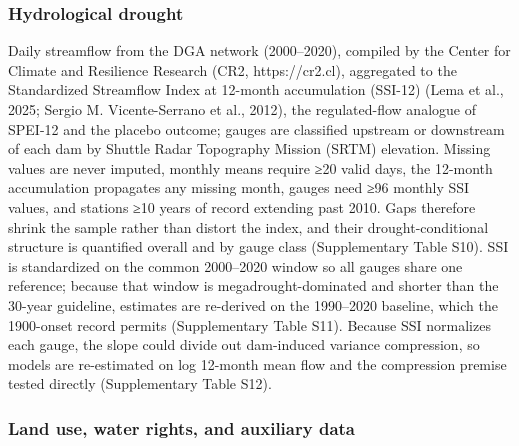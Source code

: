 \documentclass[
]{agujournal2019}
\begin{document}
\subsubsection{Hydrological drought}\label{hydrological-drought}

Daily streamflow from the DGA network (2000--2020), compiled by the
Center for Climate and Resilience Research (CR2, https://cr2.cl),
aggregated to the Standardized Streamflow Index at 12-month accumulation
(SSI-12) (Lema et al., 2025; Sergio M. Vicente-Serrano et al., 2012),
the regulated-flow analogue of SPEI-12 and the placebo outcome; gauges
are classified upstream or downstream of each dam by Shuttle Radar
Topography Mission (SRTM) elevation. Missing values are never imputed,
monthly means require ≥20 valid days, the 12-month accumulation
propagates any missing month, gauges need ≥96 monthly SSI values, and
stations ≥10 years of record extending past 2010. Gaps therefore shrink
the sample rather than distort the index, and their drought-conditional
structure is quantified overall and by gauge class (Supplementary Table
S10). SSI is standardized on the common 2000--2020 window so all gauges
share one reference; because that window is megadrought-dominated and
shorter than the 30-year guideline, estimates are re-derived on the
1990--2020 baseline, which the 1900-onset record permits (Supplementary
Table S11). Because SSI normalizes each gauge, the slope could divide
out dam-induced variance compression, so models are re-estimated on log
12-month mean flow and the compression premise tested directly
(Supplementary Table S12).

\subsubsection{Land use, water rights, and auxiliary
data}\label{land-use-water-rights-and-auxiliary-data}
\end{document}
